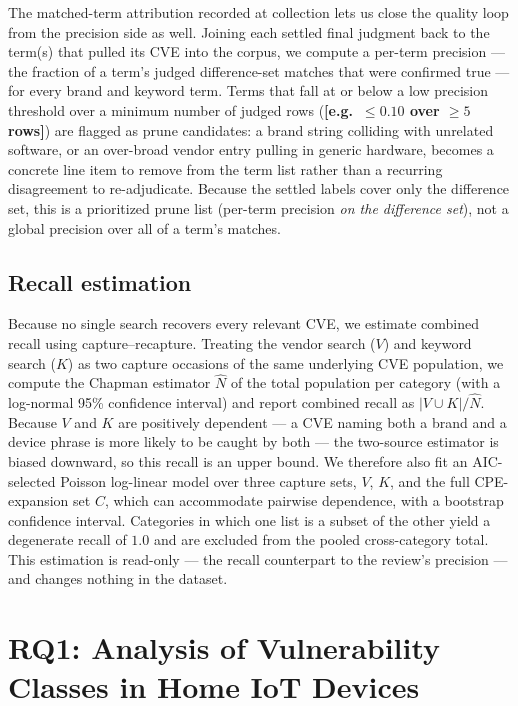 \documentclass[conference]{IEEEtran}
\newcommand{\stub}[1][?]{{\color{red}\textbf{[#1]}}}
\begin{document}
The matched-term attribution recorded at collection lets us close the quality loop
from the precision side as well. Joining each settled final judgment back to the
term(s) that pulled its CVE into the corpus, we compute a per-term precision --- the
fraction of a term's judged difference-set matches that were confirmed true --- for
every brand and keyword term. Terms that fall at or below a low precision threshold
over a minimum number of judged rows (\stub[e.g.\ $\le 0.10$ over $\ge 5$ rows]) are
flagged as prune candidates: a brand string colliding with unrelated software, or an
over-broad vendor entry pulling in generic hardware, becomes a concrete line item to
remove from the term list rather than a recurring disagreement to re-adjudicate.
Because the settled labels cover only the difference set, this is a prioritized prune
list (per-term precision \emph{on the difference set}), not a global precision over
all of a term's matches.

\subsection{Recall estimation}
\label{sec:method-recall}

Because no single search recovers every relevant CVE, we estimate combined recall
using capture--recapture. Treating the vendor search ($V$) and keyword search ($K$)
as two capture occasions of the same underlying CVE population, we compute the
Chapman estimator $\hat{N}$ of the total population per category (with a log-normal
95\% confidence interval) and report combined recall as $|V \cup K| / \hat{N}$.
Because $V$ and $K$ are positively dependent --- a CVE naming both a brand and a
device phrase is more likely to be caught by both --- the two-source estimator is
biased downward, so this recall is an upper bound. We therefore also fit an
AIC-selected Poisson log-linear model over three capture sets, $V$, $K$, and the full
CPE-expansion set $C$, which can accommodate pairwise dependence, with a bootstrap
confidence interval. Categories in which one list is a subset of the other yield a
degenerate recall of $1.0$ and are excluded from the pooled cross-category total.
This estimation is read-only --- the recall counterpart to the review's precision ---
and changes nothing in the dataset.

\section{RQ1: Analysis of Vulnerability Classes in Home IoT Devices}
\label{sec:rq1}
\end{document}
